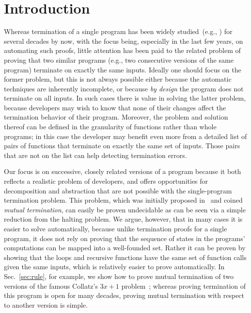 \section{Introduction} \label{sec:intro}

Whereas termination of a single program has been widely studied~(e.g.,
\cite{Fl67,CPR05,BMS05,CPR11}) for several decades by now, with the focus
being, especially in the last few years, on automating such proofs,
little attention has been paid to the related problem of proving that
two similar programs (e.g., two consecutive versions of the same
program) terminate on exactly the same inputs.  Ideally one should
focus on the former problem, but this is not always possible either
because the automatic techniques are inherently incomplete, or because
\emph{by design} the program does not terminate on all inputs. In such
cases there is value in solving the latter problem, because
developers may wish to know that none of their changes affect the
termination behavior of their program. Moreover, the problem and
solution thereof can be defined in the granularity of functions rather
than whole programs; in this case the developer may benefit even more from
a detailed list of pairs of functions that terminate on exactly the
same set of inputs. Those pairs that are not on the list can help
detecting termination errors.

Our focus is on successive, closely related versions of a program because it
both reflects a realistic problem of developers, and offers opportunities for
decomposition and abstraction that are not possible with the single-program
termination problem.  This problem, which was initially proposed in~\cite{GS08}
and coined \emph{mutual termination}, can easily be proven undecidable as can
be seen via a simple reduction from the halting problem. We argue, however,
that in many cases it is easier to solve automatically, because unlike termination proofs for a single program, it does not rely on proving that
the sequence of states in the programs' computations can be mapped into a well-founded
set. Rather it can be proven by showing that the loops and recursive functions
have the same set of function calls given the same inputs, which is relatively
easier to prove automatically. In Sec.~\ref{sec:rule}, for example, we show how to prove mutual termination of two versions of the famous Collatz's $3x + 1$ problem~\cite{G81}; whereas proving termination of this program is open for many decades, proving mutual termination with respect to another version is simple.

